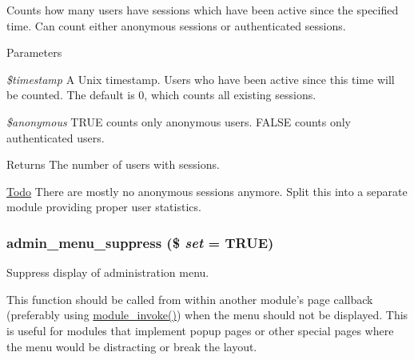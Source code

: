 Counts how many users have sessions which have been active since the specified time. Can count either anonymous sessions or authenticated sessions.


\begin{DoxyParams}{Parameters}
\item[{\em \$timestamp}]A Unix timestamp. Users who have been active since this time will be counted. The default is 0, which counts all existing sessions. \item[{\em \$anonymous}]TRUE counts only anonymous users. FALSE counts only authenticated users.\end{DoxyParams}
\begin{DoxyReturn}{Returns}
The number of users with sessions.
\end{DoxyReturn}
\begin{Desc}
\item[\hyperlink{todo__todo000030}{Todo}]There are mostly no anonymous sessions anymore. Split this into a separate module providing proper user statistics. \end{Desc}
\hypertarget{admin__menu_8module_a17cd6b917e0b38e8cd5392ae934473e0}{
\subsubsection[{admin\_\-menu\_\-suppress}]{\setlength{\rightskip}{0pt plus 5cm}admin\_\-menu\_\-suppress (\$ {\em set} = {\ttfamily TRUE})}}
\label{admin__menu_8module_a17cd6b917e0b38e8cd5392ae934473e0}
Suppress display of administration menu.

This function should be called from within another module's page callback (preferably using \hyperlink{group__hooks_ga7547905cff161d057f9e71088ec67f05}{module\_\-invoke()}) when the menu should not be displayed. This is useful for modules that implement popup pages or other special pages where the menu would be distracting or break the layout.


